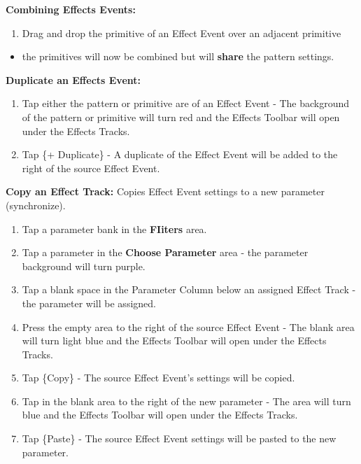 \documentclass[
]{article}
\providecommand{\tightlist}{%
  \setlength{\itemsep}{0pt}\setlength{\parskip}{0pt}}
\begin{document}
\textbf{Combining Effects Events:}

\begin{enumerate}
\def\labelenumi{\arabic{enumi}.}
\tightlist
\item
  Drag and drop the primitive of an Effect Event over an adjacent primitive
\end{enumerate}

\begin{itemize}
\tightlist
\item
  the primitives will now be combined but will \textbf{share} the pattern settings.
\end{itemize}

\textbf{Duplicate an Effects Event:}

\begin{enumerate}
\def\labelenumi{\arabic{enumi}.}
\item
  Tap either the pattern or primitive are of an Effect Event - The background of the pattern or primitive will turn red and the Effects Toolbar will open under the Effects Tracks.
\item
  Tap \{+ Duplicate\} - A duplicate of the Effect Event will be added to the right of the source Effect Event.
\end{enumerate}

\textbf{Copy an Effect Track:} Copies Effect Event settings to a new parameter (synchronize).

\begin{enumerate}
\def\labelenumi{\arabic{enumi}.}
\item
  Tap a parameter bank in the \textbf{FIiters} area.
\item
  Tap a parameter in the \textbf{Choose Parameter} area - the parameter background will turn purple.
\item
  Tap a blank space in the Parameter Column below an assigned Effect Track - the parameter will be assigned.
\item
  Press the empty area to the right of the source Effect Event - The blank area will turn light blue and the Effects Toolbar will open under the Effects Tracks.
\item
  Tap \{Copy\} - The source Effect Event's settings will be copied.
\item
  Tap in the blank area to the right of the new parameter - The area will turn blue and the Effects Toolbar will open under the Effects Tracks.
\item
  Tap \{Paste\} - The source Effect Event settings will be pasted to the new parameter.
\end{enumerate}
\end{document}
